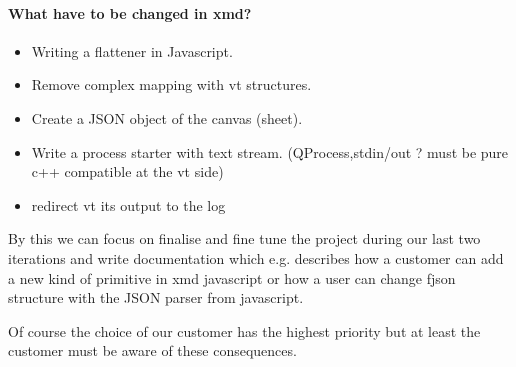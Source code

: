 \documentclass[a4paper,11pt,final]{article}
\begin{document}
\paragraph{What have to be changed in xmd?}
\begin{itemize}
\item Writing a flattener in Javascript.
\item Remove complex mapping with vt structures.
\item Create a JSON object of the canvas (sheet).
\item Write a process starter with text stream. (QProcess,stdin/out ? must be pure c++ compatible at the vt side)
\item redirect vt its output to the log
\end{itemize}


By this we can focus on finalise and fine tune the project during our last two iterations
and write documentation which e.g. describes how a customer can add a
new kind of primitive in xmd javascript or how a user can change fjson
structure with the JSON parser from javascript.

Of course the choice of our customer has the highest priority but
at least the customer must be aware of these consequences.
\end{document}
